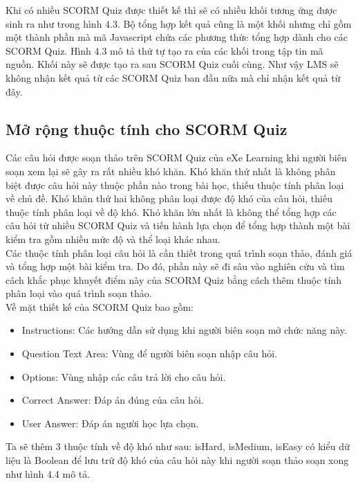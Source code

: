 	Khi có nhiều SCORM Quiz được thiết kế thì sẽ có nhiều khối tương ứng được sinh ra như trong hình 4.3. Bộ tổng hợp kết quả cũng là một khối nhưng chỉ gồm một thành phần mà mã Javascript chứa các phương thức tổng hợp dành cho các SCORM Quiz. Hình 4.3 mô tả thứ tự tạo ra của các khối trong tập tin mã nguồn. Khối này sẽ được tạo ra sau SCORM Quiz cuối cùng. Như vậy LMS sẽ không nhận kết quả từ các SCORM Quiz ban đầu nữa mà chỉ nhận kết quả từ đây.\\


\subsection{Mở rộng thuộc tính cho SCORM Quiz}

	Các câu hỏi được soạn thảo trên SCORM Quiz của eXe Learning khi người biên soạn xem lại sẽ gây ra rất nhiều khó khăn. Khó khăn thứ nhất là không phân biệt được câu hỏi này thuộc phần nào trong bài học, thiếu thuộc tính phân loại về chủ đề. Khó khăn thứ hai không phân loại được độ khó của câu hỏi, thiếu thuộc tính phân loại về độ khó. Khó khăn lớn nhất là không thể tổng hợp các câu hỏi từ nhiều SCORM Quiz và tiến hành lựa chọn để tổng hợp thành một bài kiểm tra gồm nhiều mức độ và thể loại khác nhau.\\
	
	Các thuộc tính phân loại câu hỏi là cần thiết trong quá trình soạn thảo, đánh giá và tổng hợp một bài kiểm tra. Do đó, phần này sẽ đi sâu vào nghiên cứu và tìm cách khắc phục khuyết điểm này của SCORM Quiz bằng cách thêm thuộc tính phân loại vào quá trình soạn thảo.\\
	
	Về mặt thiết kế của SCORM Quiz bao gồm:
	\begin{itemize}
		\item Instructions: Các hướng dẫn sử dụng khi người biên soạn mở chức năng này.
		
		\item Question Text Area: Vùng để người biên soạn nhập câu hỏi.
		
		\item Options: Vùng nhập các câu trả lời cho câu hỏi.
		
		\item Correct Answer: Đáp án đúng của câu hỏi.
		
		\item User Answer: Đáp án người học lựa chọn.
	\end{itemize}
	
Ta sẽ thêm 3 thuộc tính về độ khó như sau: isHard, isMedium, isEasy có kiểu dữ liệu là Boolean để lưu trữ độ khó của câu hỏi này khi người soạn thảo soạn xong như hình 4.4 mô tả.	


